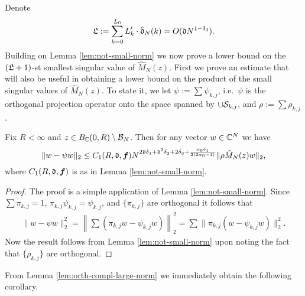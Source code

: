 \documentclass{amsart}
\numberwithin{equation}{section}
\def\corOZ{}
\def\corABrev{\textcolor{black}}
\begin{document}
Denote
\begin{equation}
  \label{eq-frakL}
  \corOZ{\gL:=\sum_{k=0}^{L_0} L_k' \cdot \hat\gd_N(k)= O(\gd N^{1-\delta_3}).}
\end{equation}
Building on Lemma \ref{lem:not-small-norm} we now prove
a lower bound on the $(\mathfrak{L}+1)$-st smallest singular value
of $\hat{M}_N(z)$. First we prove an estimate
that will also be useful in obtaining
a lower bound on the product of the small singular values of $\hat{M}_{N}(z)$.
To state it, we let
$\psi:=\sum \psi_{k,j}$, i.e.~$\psi$ is the orthogonal
projection operator onto the space spanned by
$\cup \mathcal{S}_{k,j}$, and $\rho:=\sum \rho_{k,j}$.
\begin{lemma} \label{lem:orth-compl-large-norm}
Fix $R<\infty$ and $z \in B_{\mathbb{C}}(0,R) \setminus \mathcal{B}_N$.  Then for any vector $w \in \mathbb{C}^N$ we have
  \[
    \|w- \psi w\|_2    \leq C_1(R,\gd, {\bm f}) N^{2\gd\delta_1+ \gd^2 \delta_2+2\delta_3+ \corABrev{\frac{\alpha_0\delta_1}{2(2\alpha_0-1)}}}\|\rho \hat{M}_N(z) w\|_2,
  \]
where $C_1(R,\mathfrak{d}, {\bm f})$ is as in Lemma \ref{lem:not-small-norm}.
 \end{lemma}
\begin{proof}
The proof is a simple application of Lemma \ref{lem:not-small-norm}. Since $\sum \pi_{k,j}=1$, $\pi_{k,j} \psi_{k,j}=\psi_{k,j}$, and $\{\pi_{k,j}\}$ are orthogonal it follows that
\begin{align*}
 \|w-\psi w\|_2^2 =  \left\|\sum (\pi_{k,j} w - \psi_{k,j} w)\right\|_2^2 = \sum \|\pi_{k,j}(w-\psi_{k,j}w)\|_2^2.
\end{align*}
Now the result follows from Lemma \ref{lem:not-small-norm} upon noting the fact that $\{\rho_{k,j}\}$ are orthogonal.
\end{proof}

From Lemma \ref{lem:orth-compl-large-norm} we immediately obtain the following corollary.
\end{document}
